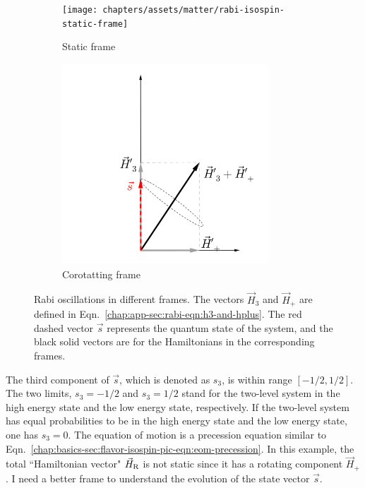 \begin{figure}[htbp]
	\centering
	\begin{subfigure}[t]{0.5\textwidth}
		\centering
		\texttt{[image: chapters/assets/matter/rabi-isospin-static-frame]}
		\caption{Static frame}\label{chap:app-sec:rabi-fig:rabi-static-frame}
	\end{subfigure}%
	\begin{subfigure}[t]{0.5\textwidth}
		\centering
		\includegraphics[width=0.85\textwidth]{chapters/assets/matter/rabi-isospin-rotating-frame}
		\caption{Corotatting frame}\label{chap:app-sec:rabi-fig:rabi-rotating-frame}
	\end{subfigure}
	\caption{
  Rabi oscillations in different frames. The vectors $\vec H_3$ and $\vec H_+$ are defined in Eqn.~\ref{chap:app-sec:rabi-eqn:h3-and-hplus}. The red dashed vector $\vec s$ represents the quantum state of the system, and the black solid vectors are for the Hamiltonians in the corresponding frames.
  }\label{chap:app-sec:rabi-fig:rabi-frames}
\end{figure}


The third component of $\vec{s}$, which is denoted as $s_3$, is within range $[-1/2,1/2]$. The two limits, $s_3=-1/2$ and $s_3=1/2$ stand for the two-level system in the high energy state and the low energy state, respectively. If the two-level system has equal probabilities to be in the high energy state and the low energy state, one has $s_3=0$. The equation of motion is a precession equation similar to Eqn.~\ref{chap:basics-sec:flavor-isospin-pic-eqn:eom-precession}. In this example, the total ``Hamiltonian vector" $\vec H_\mathrm R$ is not static since it has a rotating component $\vec H_+$. I need a better frame to understand the evolution of the state vector $\vec s$.


